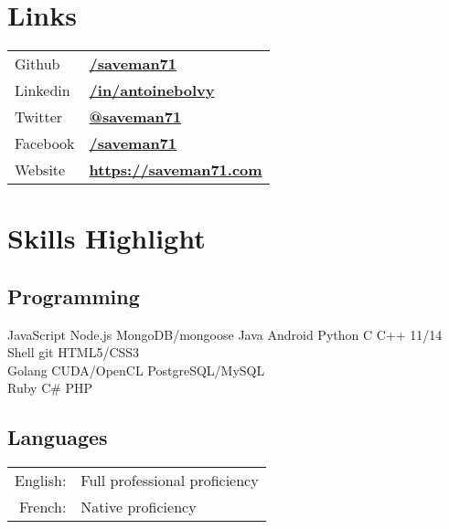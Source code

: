 \documentclass[
  english,
  a4paper
]{resume-openfont}
\begin{document}
\begin{minipage}[t]{0.31\textwidth}
\section{Links}
\begin{tabular}{@{}l@{\hskip 0.5em}l}
Github & \href{https://github.com/saveman71}{\bf /saveman71} \\
Linkedin & \href{https://www.linkedin.com/in/antoinebolvy}{\bf /in/antoinebolvy} \\
Twitter & \href{https://twitter.com/saveman71}{\bf @saveman71} \\
Facebook & \href{https://facebook.com/saveman71}{\bf /saveman71} \\
Website & \href{https://saveman71.com}{\bf https://saveman71.com} \\
\end{tabular}
\sectionsep


\section{Skills Highlight}
\subsection{Programming}
\vspace{2pt}
JavaScript \textbullet{} Node.js \textbullet{} MongoDB/mongoose \textbullet{} Java \textbullet{} Android \textbullet{} Python \textbullet{} C \textbullet{} C++ 11/14 \textbullet{} Shell \textbullet{}  \textbullet{} git \textbullet{} HTML5/CSS3\\
Golang \textbullet{} CUDA/OpenCL \textbullet{} PostgreSQL/MySQL\\
Ruby \textbullet{} C\# \textbullet{} PHP\\
\sectionsep

\subsection{Languages}
\vspace{2pt}
\begin{tabular}{@{}r@{\hskip 0.5em}l}
English: &Full professional proficiency \\
French: &Native proficiency
\end{tabular}
\sectionsep


\end{minipage}
\end{document}
